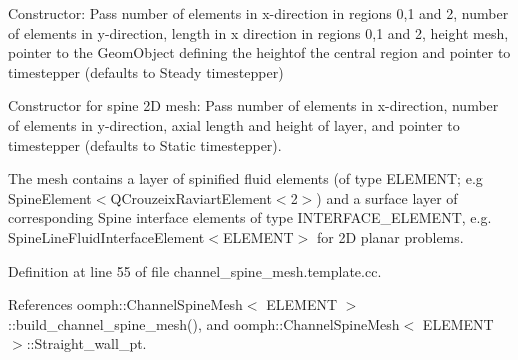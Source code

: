 Constructor\+: Pass number of elements in x-\/direction in regions 0,1 and 2, number of elements in y-\/direction, length in x direction in regions 0,1 and 2, height mesh, pointer to the Geom\+Object defining the heightof the central region and pointer to timestepper (defaults to Steady timestepper) 

Constructor for spine 2D mesh\+: Pass number of elements in x-\/direction, number of elements in y-\/direction, axial length and height of layer, and pointer to timestepper (defaults to Static timestepper).

The mesh contains a layer of spinified fluid elements (of type E\+L\+E\+M\+E\+NT; e.\+g Spine\+Element$<$Q\+Crouzeix\+Raviart\+Element$<$2$>$) and a surface layer of corresponding Spine interface elements of type I\+N\+T\+E\+R\+F\+A\+C\+E\+\_\+\+E\+L\+E\+M\+E\+NT, e.\+g. Spine\+Line\+Fluid\+Interface\+Element$<$\+E\+L\+E\+M\+E\+N\+T$>$ for 2D planar problems. 

Definition at line 55 of file channel\+\_\+spine\+\_\+mesh.\+template.\+cc.



References oomph\+::\+Channel\+Spine\+Mesh$<$ E\+L\+E\+M\+E\+N\+T $>$\+::build\+\_\+channel\+\_\+spine\+\_\+mesh(), and oomph\+::\+Channel\+Spine\+Mesh$<$ E\+L\+E\+M\+E\+N\+T $>$\+::\+Straight\+\_\+wall\+\_\+pt.

\mbox{\label{classoomph_1_1ChannelSpineMesh_afb1b729691c03cef065d351094092406}} 
